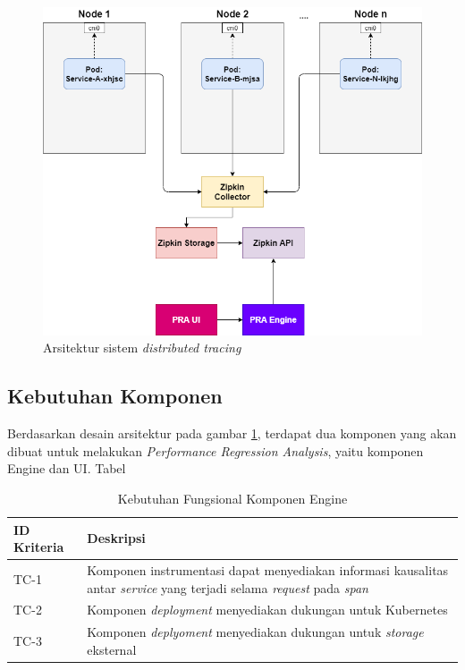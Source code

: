 \begin{figure}[!htb]
	\centering
	\includegraphics[width=1\textwidth]{resources/ch3/arch.png}
	\caption{Arsitektur sistem \textit{distributed tracing}}
	\label{arch-pra}
\end{figure}

\subsection{Kebutuhan Komponen}

Berdasarkan desain arsitektur pada gambar \ref{arch-pra}, terdapat dua komponen yang akan dibuat untuk melakukan \textit{Performance Regression Analysis}, yaitu komponen Engine dan UI. Tabel 

\begin{small}
	\begin{longtable}{ | p{3cm} | p{10cm} |}
		\caption{Kebutuhan Fungsional Komponen Engine}
		\label{ch3-func-engine}                                                           
		\\ \hline
		\centering\bfseries{ID Kriteria} & \centering\bfseries{Deskripsi} \tabularnewline \hline
		\endfirsthead
		TC-1 & Komponen instrumentasi dapat menyediakan informasi kausalitas antar \textit{service} yang terjadi selama \textit{request} pada \textit{span} \\ \hline
		TC-2 & Komponen \textit{deployment} menyediakan dukungan untuk Kubernetes \\ \hline
		TC-3 & Komponen \textit{deplyoment} menyediakan dukungan untuk \textit{storage} eksternal \\ \hline
	\end{longtable}
\end{small}


